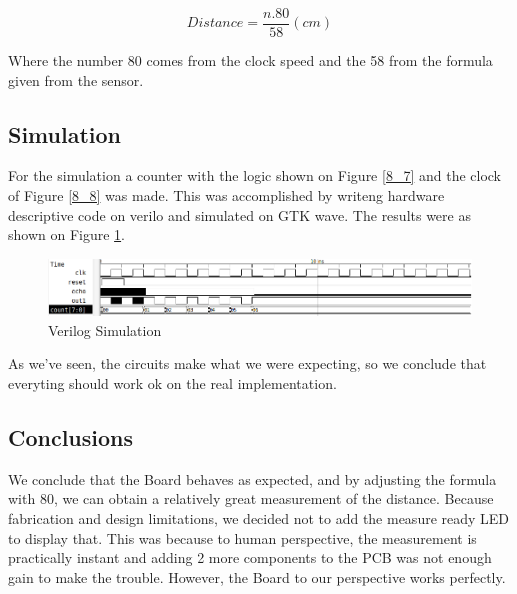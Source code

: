 \[
Distance=\frac{n.80}{58}(cm)
\]

Where the number 80 comes from the clock speed and the 58 from the
formula given from the sensor.

\subsection{\color{purple}Simulation}

For the simulation a counter with the logic shown on Figure \ref{8_7}
and the clock of Figure \ref{8_8} was made. This was accomplished
by writeng hardware descriptive code on verilo and simulated on GTK
wave. The results were as shown on Figure \ref{8_13}.

\begin{figure}[h!]
\begin{centering}
\includegraphics[scale=0.5]{../Exercise8/Informe/images/Count_simulation}
\par\end{centering}
\caption{\color{cyan}Verilog Simulation}
\label{8_13}

\end{figure}

As we've seen, the circuits make what we were expecting, so we conclude
that everyting should work ok on the real implementation.

\subsection{\color{purple}Conclusions}

We conclude that the Board behaves as expected, and by adjusting the
formula with 80, we can obtain a relatively great measurement of the
distance. Because fabrication and design limitations, we decided not
to add the measure ready LED to display that. This was because to
human perspective, the measurement is practically instant and adding
2 more components to the PCB was not enough gain to make the trouble.
However, the Board to our perspective works perfectly.
